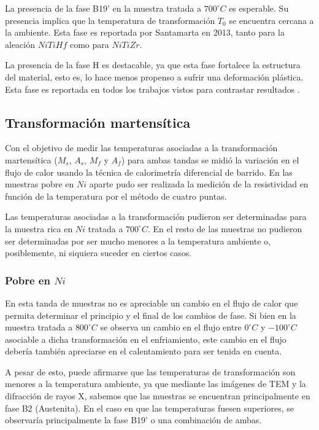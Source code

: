 \documentclass[12pt]{article}
\theoremstyle{definition}
\theoremstyle{remark}
\begin{document}
{La presencia de la fase B19' en la muestra tratada a $700 ^\circ C$ es esperable. Su presencia implica que la temperatura de transformación $T_0$ se encuentra cercana a la ambiente. Esta fase es reportada por Santamarta en 2013, tanto para la aleación $NiTiHf$ como para $NiTiZr$. 

La presencia de la fase H es destacable, ya que esta fase fortalece la estructura del material, esto es, lo hace menos propenso a sufrir una deformación plástica. Esta fase es reportada en todos los trabajos vistos para contrastar resultados \cite{Santamarta2013} \cite{Bigelow2019} \cite{Evirgen2018} \cite{Yang2013}.

\subsection{Transformación martensítica}
\label{TransfomacionDiscusion}
Con el objetivo de medir las temperaturas asociadas a la transformación martensítica ($M_s$, $A_s$, $M_f$ y $A_f$) para ambas tandas se midió la variación en el flujo de calor usando la técnica de calorimetría diferencial de barrido. En las muestras pobre en $Ni$ aparte pudo ser realizada la medición de la resistividad en función de la temperatura por el método de cuatro puntas. 

Las temperaturas asociadas a la transformación pudieron ser determinadas para la muestra rica en $Ni$ tratada a $700^\circ C$. En el resto de las muestras no pudieron ser determinadas por ser mucho menores a la temperatura ambiente o, posiblemente, ni siquiera suceder en ciertos casos.


\subsubsection{Pobre en $Ni$}
En esta tanda de muestras no es apreciable un cambio en el flujo de calor que permita determinar el principio y el final de los cambios de fase. Si bien en la muestra tratada a $800^\circ C$ se observa un cambio en el flujo entre $0^\circ C$ y $-100^\circ C$ asociable a dicha transformación en el enfriamiento, este cambio en el flujo debería también apreciarse en el calentamiento para ser tenida en cuenta.

A pesar de esto, puede afirmarse que las temperaturas de transformación son menores a la temperatura ambiente, ya que mediante las imágenes de TEM y la difracción de rayos X, sabemos que las muestras se encuentran principalmente en fase B2 (Austenita). En el caso en que las temperaturas fuesen superiores, se observaría principalmente la fase B19' o una combinación de ambas.

}
\end{document}
